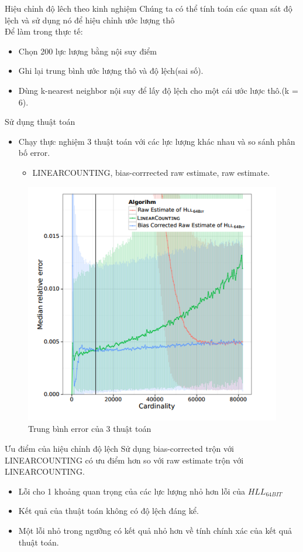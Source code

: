 \documentclass{beamer}
\newcommand{\bi}{\begin{itemize}}
\newcommand{\ei}{\end{itemize}}
\begin{document}
\begin{frame}{Hiệu chỉnh độ lêch theo kinh nghiệm}
Chúng ta có thể tính toán các quan sát độ lệch và sử dụng nó để hiệu chỉnh ước lượng thô \\ 

Để làm trong thực tế:
\bi
\item Chọn 200 lực lượng bằng nội suy điểm
\item Ghi lại trung bình ước lượng thô và độ lệch(sai số).
\item Dùng k-nearest neighbor nội suy để lấy độ lệch cho một cái ước lược thô.(k = 6).
\ei
\end{frame}
\begin{frame}{Sử dụng thuật toán}
\begin{itemize}
\item Chạy thực nghiệm 3 thuật toán với các lực lượng khác nhau và so sánh phân bố error.
\bi
\item LINEARCOUNTING, bias-corrrected raw estimate, raw estimate.
\ei
\end{itemize}
\begin{figure}[h]
\includegraphics[scale=0.45]{img2.png}
\caption{Trung bình error của 3 thuật toán}
\end{figure}
\end{frame}
\begin{frame}{Ưu điểm của hiệu chỉnh độ lệch}
Sử dụng bias-corrected trộn với LINEARCOUNTING có ưu điểm hơn so với raw estimate trộn với LINEARCOUNTING.
\begin{itemize}
\item Lỗi cho 1 khoảng quan trọng của các lực lượng nhỏ hơn lỗi của $HLL_{64BIT}$
\item Kết quả của thuật toán không có độ lệch đáng kể.
\item Một lỗi nhỏ trong ngưỡng có kết quả nhỏ hơn về tính chính xác của kết quả thuật toán. 
\end{itemize} 
\end{frame}
\end{document}
